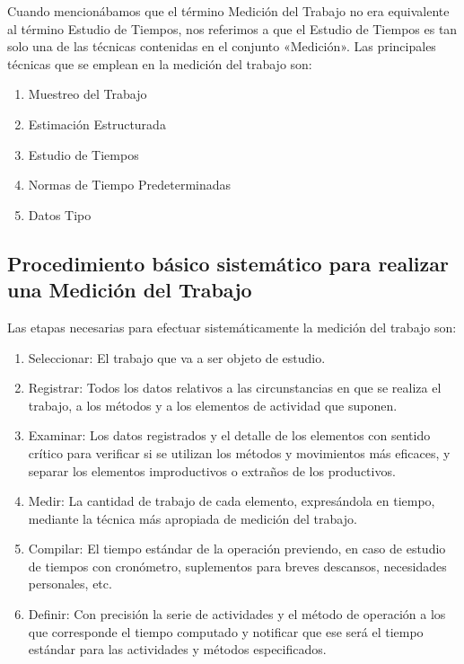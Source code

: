 \documentclass[../main]{subfiles}
\begin{document}
Cuando mencionábamos que el término Medición del Trabajo no era
equivalente al término Estudio de Tiempos, nos referimos a que el
Estudio de Tiempos es tan solo una de las técnicas contenidas en el
conjunto «Medición». Las principales técnicas que se emplean en la
medición del trabajo son:

\begin{enumerate}
  \item Muestreo del Trabajo
  \item Estimación Estructurada
  \item Estudio de Tiempos
  \item Normas de Tiempo Predeterminadas
  \item Datos Tipo
\end{enumerate}

\subsection{Procedimiento básico sistemático para realizar una
Medición del Trabajo}
Las etapas necesarias para efectuar sistemáticamente la medición
del trabajo son:

\begin{enumerate}
  \item Seleccionar: El trabajo que va a ser objeto de estudio.
  \item Registrar: Todos los datos relativos a las circunstancias en
    que se realiza el trabajo, a los métodos y a los elementos de
    actividad que suponen.
  \item Examinar: Los datos registrados y el detalle de los elementos
    con sentido crítico para verificar si se utilizan los métodos y
    movimientos más eficaces, y separar los elementos improductivos o
    extraños de los productivos.
  \item Medir: La cantidad de trabajo de cada elemento, expresándola
    en tiempo, mediante la técnica más apropiada de medición del trabajo.
  \item Compilar: El tiempo estándar de la operación previendo, en
    caso de estudio de tiempos con cronómetro, suplementos para
    breves descansos, necesidades personales, etc.
  \item Definir: Con precisión la serie de actividades y el método de
    operación a los que corresponde el tiempo computado y notificar
    que ese será el tiempo estándar para las actividades y métodos
    especificados.

\end{enumerate}
\end{document}
